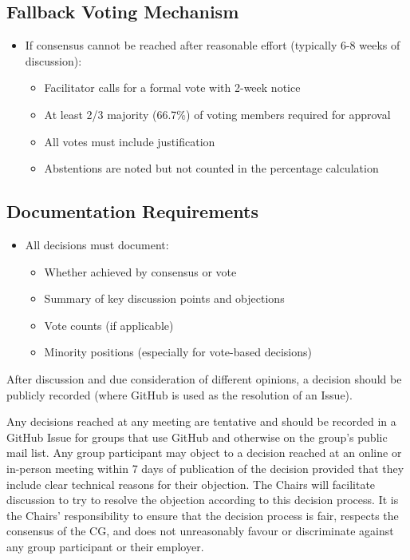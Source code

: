 \documentclass[title=small,preset=opensansnote,par=skip]{article}
\begin{document}
\subsection{Fallback Voting Mechanism}
\label{sec:org4c2dd7f}

\begin{itemize}
\item If consensus cannot be reached after reasonable effort (typically 6-8 weeks of discussion):
\begin{itemize}
\item Facilitator calls for a formal vote with 2-week notice
\item At least 2/3 majority (66.7\%) of voting members required for approval
\item All votes must include justification
\item Abstentions are noted but not counted in the percentage calculation
\end{itemize}
\end{itemize}
\subsection{Documentation Requirements}
\label{sec:org783d629}

\begin{itemize}
\item All decisions must document:
\begin{itemize}
\item Whether achieved by consensus or vote
\item Summary of key discussion points and objections
\item Vote counts (if applicable)
\item Minority positions (especially for vote-based decisions)
\end{itemize}
\end{itemize}

After discussion and due consideration of different opinions, a decision should be publicly recorded (where GitHub is used as the resolution of an Issue).

Any decisions reached at any meeting are tentative and should be recorded in a GitHub Issue for groups that use GitHub and otherwise on the group's public mail list. Any group participant may object to a decision reached at an online or in-person meeting within 7 days of publication of the decision provided that they include clear technical reasons for their objection. The Chairs will facilitate discussion to try to resolve the objection according to this decision process. It is the Chairs' responsibility to ensure that the decision process is fair, respects the consensus of the CG, and does not unreasonably favour or discriminate against any group participant or their employer.
\end{document}
